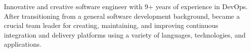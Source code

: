 \textcolor{awesome}{\raisebox{0.1\height}{\faBook\thinspace}}


\begin{cvparagraph}

Innovative and creative software engineer with 9+ years of experience in DevOps. After transitioning from a general software development background, became a crucial team leader for creating, maintaining, and improving continuous integration and delivery platforms using a variety of languages, technologies, and applications.
\end{cvparagraph}
